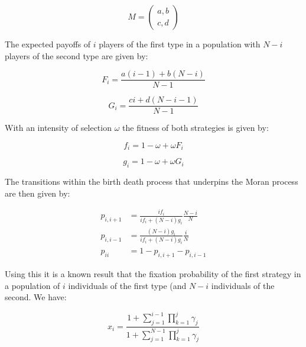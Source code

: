 \documentclass{article}
\begin{document}
\begin{equation}\label{equ:payoff_matrix}
    M = \begin{pmatrix}
        a, b\\
        c, d
        \end{pmatrix}
\end{equation}

The expected payoffs of \(i\) players of the first type in a population with \(N
- i\) players of the second type are given by:

\begin{equation}\label{equ:expected_payoff_one}
    F_i = \frac{a(i - 1) + b(N - i)}{N - 1}
\end{equation}

\begin{equation}\label{equ:expected_payoff_two}
    G_i = \frac{ci + d(N - i - 1)}{N - 1}
\end{equation}

With an intensity of selection \(\omega\) the fitness of both strategies is
given by:

\begin{equation}\label{equ:expected_payoff_one}
    f_i = 1 - \omega + \omega F_i
\end{equation}

\begin{equation}\label{equ:expected_payoff_two}
    g_i = 1 - \omega + \omega G_i
\end{equation}

The transitions within the birth death process that underpins the Moran process
are then given by:

\begin{align}
	p_{i, i+1}&= \frac{if_i}{if_i+(N-i)g_i}\frac{N-i}{N}\label{equ:p_up}\\
	p_{i, i-1}&= \frac{(N-i)g_i}{if_i+(N-i)g_i}\frac{i}{N}\label{equ:p_down}\\
	p_{ii} &= 1 - p_{i, i+1} - p_{i, i-1}\label{equ:p_stay}
\end{align}

Using this it is a known result that the fixation probability of the first
strategy in a population of \(i\) individuals of the first type (and \(N-i\)
individuals of the second. We have:

\begin{equation}\label{equ:fixation_probability}
x_i = \frac{1 + \sum_{j=1}^{i-1}\prod_{k=1}^{j}\gamma_j}{1 + \sum_{j=1}^{N-1}
      \prod_{k=1}^{j}\gamma_j}
\end{equation}
\end{document}
